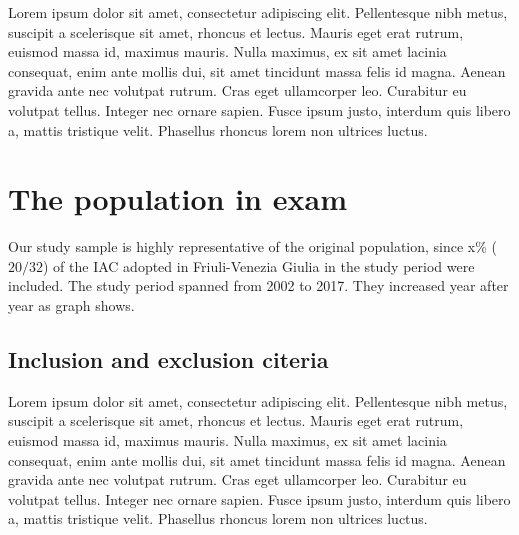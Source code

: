 

\label{chap:materialsandmethods}
Lorem ipsum dolor sit amet, consectetur adipiscing elit. Pellentesque nibh metus, suscipit a scelerisque sit amet, rhoncus et lectus. Mauris eget erat rutrum, euismod massa id, maximus mauris. Nulla maximus, ex sit amet lacinia consequat, enim ante mollis dui, sit amet tincidunt massa felis id magna. Aenean gravida ante nec volutpat rutrum. Cras eget ullamcorper leo. Curabitur eu volutpat tellus. Integer nec ornare sapien. Fusce ipsum justo, interdum quis libero a, mattis tristique velit. Phasellus rhoncus lorem non ultrices luctus.

\section{The population in exam}\label{sec:thepopulationinexam}
Our study sample is highly representative of the original population, since x\% ($20/32$) of the IAC adopted in Friuli-Venezia Giulia in the study period were included.
The study period spanned from 2002 to 2017. They increased year after year as graph shows.


\subsection{Inclusion and exclusion citeria}\label{sub:inclusionandexclusionciteria}
Lorem ipsum dolor sit amet, consectetur adipiscing elit. Pellentesque nibh metus, suscipit a scelerisque sit amet, rhoncus et lectus. Mauris eget erat rutrum, euismod massa id, maximus mauris. Nulla maximus, ex sit amet lacinia consequat, enim ante mollis dui, sit amet tincidunt massa felis id magna. Aenean gravida ante nec volutpat rutrum. Cras eget ullamcorper leo. Curabitur eu volutpat tellus. Integer nec ornare sapien. Fusce ipsum justo, interdum quis libero a, mattis tristique velit. Phasellus rhoncus lorem non ultrices luctus.


